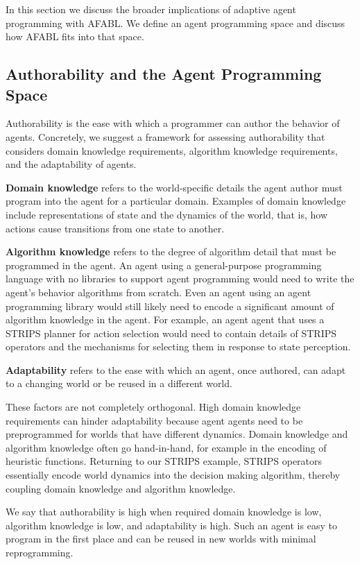 In this section we discuss the broader implications of adaptive agent programming with AFABL. We define an agent programming space and discuss how AFABL fits into that space.

\subsection{Authorability and the Agent Programming Space}

Authorability is the ease with which a programmer can author the behavior of agents.  Concretely, we suggest a framework for assessing authorability that considers domain knowledge requirements, algorithm knowledge requirements, and the adaptability of agents.

{\bf Domain knowledge} refers to the world-specific details the agent author must program into the agent for a particular domain.  Examples of domain knowledge include representations of state and the dynamics of the world, that is, how actions cause transitions from one state to another.

{\bf Algorithm knowledge} refers to the degree of algorithm detail that must be programmed in the agent.  An agent using a general-purpose programming language with no libraries to support agent programming would need to write the agent's behavior algorithms from scratch. Even an agent using an agent programming library would still likely need to encode a significant amount of algorithm knowledge in the agent. For example, an agent agent that uses a STRIPS planner for action selection would need to contain details of STRIPS operators and the mechanisms for selecting them in response to state perception.

{\bf Adaptability} refers to the ease with which an agent, once authored, can adapt to a changing world or be reused in a different world.

These factors are not completely orthogonal.  High domain knowledge requirements can hinder adaptability because agent agents need to be preprogrammed for worlds that have different dynamics.  Domain knowledge and algorithm knowledge often go hand-in-hand, for example in the encoding of heuristic functions.  Returning to our STRIPS example, STRIPS operators essentially encode world dynamics into the decision making algorithm, thereby coupling domain knowledge and algorithm knowledge.

We say that authorability is high when required domain knowledge is low, algorithm knowledge is low, and adaptability is high.  Such an agent is easy to program in the first place and can be reused in new worlds with minimal reprogramming.

